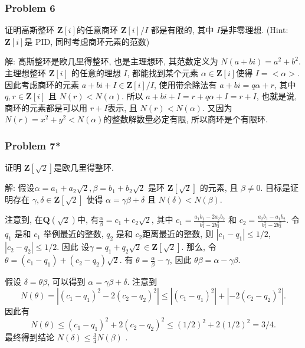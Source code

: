 \documentclass[a4paper,12pt]{ctexart}
\newcommand{\Z}{\mathbf{Z}}
\newcommand{\Q}{\mathbf{Q}}
\begin{document}
\subsubsection*{Problem 6}
    证明高斯整环 $ \Z[i] $的任意商环 $ \Z[i]/I $ 都是有限的, 其中 $ I $是非零理想. (Hint: $ \Z[i] $是 PID, 同时考虑商环元素的范数)

    解: 高斯整环是欧几里得整环, 也是主理想环, 其范数定义为 $ N(a+bi)=a^2+b^2 $. 主理想整环 $ \Z[i] $ 的任意的理想 $ I $, 
    都能找到某个元素 $ \alpha\in \Z[i] $使得 $ I=<\alpha> $. 因此考虑商环的元素 $ a+bi+I\in\Z[i]/I $, 使用带余除法有  $ a+bi=q\alpha+r $, 其中 $ q,r\in\Z[i] $
    且 $ N(r)<N(\alpha) $. 所以 $ a+bi+I=r+q\alpha+I=r+I $, 也就是说, 商环的元素都是可以用 $ r+I $表示, 且 $ N(r)<N(\alpha) $. 
    又因为 $ N(r)=x^2+y^2<N(\alpha) $的整数解数量必定有限, 所以商环是个有限环.
\subsubsection*{Problem 7*}
    证明 $ \Z[\sqrt{2}] $是欧几里得整环. 

    解: 假设$\alpha=a_{1}+a_{2} \sqrt{2}, \beta=b_{1}+b_{2} \sqrt{2}$ 是环 $\Z[\sqrt{2}]$ 的元素, 且 $\beta \neq 0$. 目标是证明存在 $\gamma,\delta\in\Z[\sqrt{2}]$ 使得 $\alpha=\gamma \beta+\delta$ 且 $N(\delta)<N(\beta)$. 
    
    注意到, 在$\Q(\sqrt{2})$中, 有$\frac{\alpha}{\beta}=c_{1}+c_{2} \sqrt{2}$, 其中 $c_{1}=\frac{a_{1} b_{1}-2 a_{2} b_{2}}{b_{1}^{2}-2 b_{2}^{2}}$ 和 $c_{2}=\frac{a_{2} b_{1}-a_{1} b_{2}}{b_{1}^{2}-2 b_{2}^{2}}$.
    令 $q_{1}$ 是和 $c_{1}$ 举例最近的整数, $q_{2}$ 是和 $c_{2}$距离最近的整数, 则 $\left|c_{1}-q_{1}\right| \leq 1 / 2$, $\left|c_{2}-q_{2}\right| \leq 1 / 2$. 因此 设$\gamma=q_{1}+q_{2} \sqrt{2} \in \Z[\sqrt{2}]$. 那么, 令 $\theta=\left(c_{1}-q_{1}\right)+\left(c_{2}-q_{2}\right) \sqrt{2}$. 有 $\theta=\frac{\alpha}{\beta}-\gamma$, 因此 $\theta \beta=\alpha-\gamma \beta$.
    
    假设 $\delta=\theta \beta$, 可以得到 $\alpha=\gamma \beta+\delta$. 注意到
    \[
    N(\theta)=\left|\left(c_{1}-q_{1}\right)^{2}-2\left(c_{2}-q_{2}\right)^{2}\right| \leq\left|\left(c_{1}-q_{1}\right)^{2}\right|+\left|-2\left(c_{2}-q_{2}\right)^{2}\right|.
    \]
    因此有
    \[
    N(\theta) \leq\left(c_{1}-q_{1}\right)^{2}+2\left(c_{2}-q_{2}\right)^{2} \leq(1 / 2)^{2}+2(1 / 2)^{2}=3 / 4 .
    \]
    最终得到结论 $N(\delta) \leq \frac{3}{4} N(\beta)$ .
\end{document}

